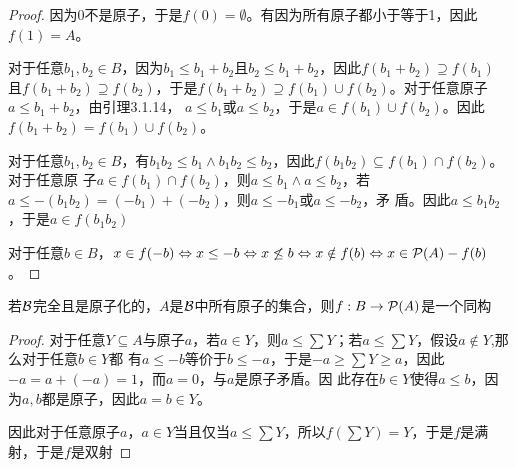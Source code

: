 \documentclass[11pt]{article}
\begin{document}
\begin{proof}
因为0不是原子，于是\(f(0)=\emptyset\)。有因为所有原子都小于等于1，因此\(f(1)=A\)。

对于任意\(b_1,b_2\in B\)，因为\(b_1\le b_1+b_2\)且\(b_2\le b_1+b_2\)，因此\(f(b_1+b_2)\supseteq f(b_1)\)
且\(f(b_1+b_2)\supseteq f(b_2)\)，于是\(f(b_1+b_2)\supseteq f(b_1)\cup f(b_2)\)。对于任意原子\(a\le b_1+b_2\)，由引理3.1.14，
\(a\le b_1\)或\(a\le b_2\)，于是\(a\in f(b_1)\cup f(b_2)\)。因此\(f(b_1+b_2)=f(b_1)\cup f(b_2)\)。

对于任意\(b_1,b_2\in B\)，有\(b_1b_2\le b_1\wedge b_1b_2\le b_2\)，因此\(f(b_1b_2)\subseteq f(b_1)\cap f(b_2)\)。对于任意原
子\(a\in f(b_1)\cap f(b_2)\)，则\(a\le b_1\wedge a\le b_2\)，若\(a\le-(b_1b_2)=(-b_1)+(-b_2)\)，则\(a\le -b_1\)或\(a\le -b_2\)，矛
盾。因此\(a\le b_1b_2\)，于是\(a\in f(b_1b_2)\)

对于任意\(b\in B\)，\(x\in f(-b)\Leftrightarrow x\le -b\Leftrightarrow x\not\le b\Leftrightarrow x\notin f(b)\Leftrightarrow x\in \mathcal{P}(A)-f(b)\)。
\end{proof}

\begin{exercise}[3.1.22]
若\(\mathcal{B}\)完全且是原子化的，\(A\)是\(\mathcal{B}\)中所有原子的集合，则\(f:B\to\mathcal{P}(A)\)是一个同构
\end{exercise}

\begin{proof}
对于任意\(Y\subseteq A\)与原子\(a\)，若\(a\in Y\)，则\(a\le\sum Y\)；若\(a\le\sum Y\)，假设\(a\notin Y\),那么对于任意\(b\in Y\)都
有\(a\le -b\)等价于\(b\le -a\)，于是\(-a\ge\sum Y\ge a\)，因此\(-a=a+(-a)=1\)，而\(a=0\)，与\(a\)是原子矛盾。因
此存在\(b\in Y\)使得\(a\le b\)，因为\(a,b\)都是原子，因此\(a=b\in Y\)。

因此对于任意原子\(a\)，\(a\in Y\)当且仅当\(a\le\sum Y\)，所以\(f(\sum Y)=Y\)，于是\(f\)是满射，于是\(f\)是双射
\end{proof}
\end{document}
